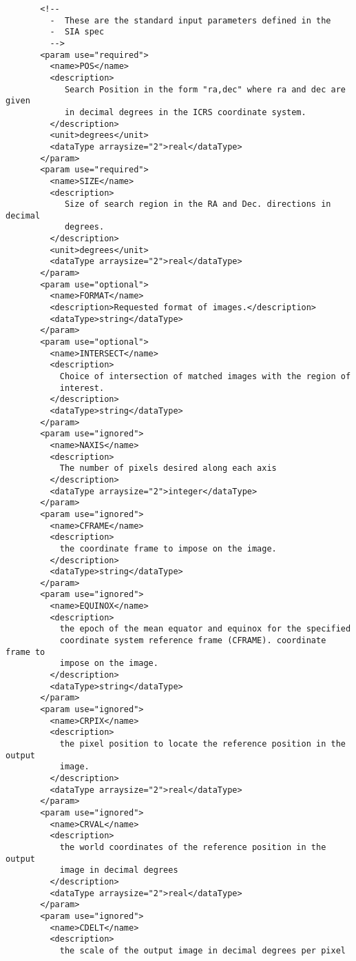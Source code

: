 \documentclass[11pt,a4paper]{ivoa}
\begin{document}
{{\begin{verbatim}
       <!-- 
         -  These are the standard input parameters defined in the 
         -  SIA spec
         -->
       <param use="required">
         <name>POS</name>
         <description>
            Search Position in the form "ra,dec" where ra and dec are given 
            in decimal degrees in the ICRS coordinate system.
         </description>
         <unit>degrees</unit>
         <dataType arraysize="2">real</dataType>
       </param>
       <param use="required">
         <name>SIZE</name>
         <description>
            Size of search region in the RA and Dec. directions in decimal 
            degrees.
         </description>
         <unit>degrees</unit>
         <dataType arraysize="2">real</dataType>
       </param>
       <param use="optional">
         <name>FORMAT</name>
         <description>Requested format of images.</description>
         <dataType>string</dataType>
       </param>
       <param use="optional">
         <name>INTERSECT</name>
         <description>
           Choice of intersection of matched images with the region of 
           interest.
         </description>
         <dataType>string</dataType>
       </param>
       <param use="ignored">
         <name>NAXIS</name>
         <description>
           The number of pixels desired along each axis
         </description>
         <dataType arraysize="2">integer</dataType>
       </param>
       <param use="ignored">
         <name>CFRAME</name>
         <description>
           the coordinate frame to impose on the image.
         </description>
         <dataType>string</dataType>
       </param>
       <param use="ignored">
         <name>EQUINOX</name>
         <description>
           the epoch of the mean equator and equinox for the specified 
           coordinate system reference frame (CFRAME). coordinate frame to 
           impose on the image.
         </description>
         <dataType>string</dataType>
       </param>
       <param use="ignored">
         <name>CRPIX</name>
         <description>
           the pixel position to locate the reference position in the output
           image.
         </description>
         <dataType arraysize="2">real</dataType>
       </param>
       <param use="ignored">
         <name>CRVAL</name>
         <description>
           the world coordinates of the reference position in the output
           image in decimal degrees
         </description>
         <dataType arraysize="2">real</dataType>
       </param>
       <param use="ignored">
         <name>CDELT</name>
         <description>
           the scale of the output image in decimal degrees per pixel

\end{verbatim}}}
\end{document}
